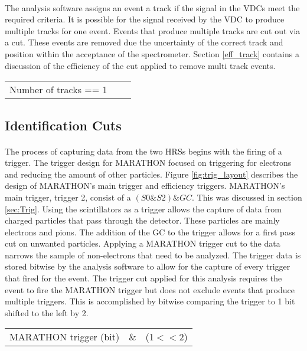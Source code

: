 \paragraph{} The analysis software assigns an event a track if the signal in the VDCs meet the required criteria. It is possible for the signal received by the VDC to produce multiple tracks for one event. Events that produce multiple tracks are cut out via a cut. These events are removed due the uncertainty of the correct track and position within the acceptance of the spectrometer. Section \ref{eff_track} contains a discussion of the efficiency of the cut applied to remove multi track events. 

\begin{tabular}{@{$\bullet$ }lll}
	Number of tracks == 1
\end{tabular}




\subsection{Identification Cuts}
\paragraph{} The process of capturing data from the two HRSs begins with the firing of a trigger. The trigger design for MARATHON focused on triggering for electrons and reducing the amount of other particles. Figure \ref{fig:trig_layout} describes the design of MARATHON's main trigger and efficiency triggers. MARATHON's main trigger, trigger 2, consist of a $(S0 \& S2) \& GC$. This was discussed in section \ref{sec:Trig}. Using the scintillators as a trigger allows the capture of data from charged particles that pass through the detector. These particles are mainly electrons and pions. The addition of the GC to the trigger allows for a first pass cut on unwanted particles. Applying a MARATHON trigger cut to the data narrows the sample of non-electrons that need to be analyzed. The trigger data is stored bitwise by the analysis software to allow for the capture of every trigger that fired for the event. The trigger cut applied for this analysis requires the event to fire the MARATHON trigger but does not exclude events that produce multiple triggers. This is accomplished by bitwise comparing the trigger to 1 bit shifted to the left by 2.  
   
\begin{tabular}{@{$\bullet$ }lll}
	MARATHON trigger (bit) &\& &(1$<<$2)
\end{tabular}

